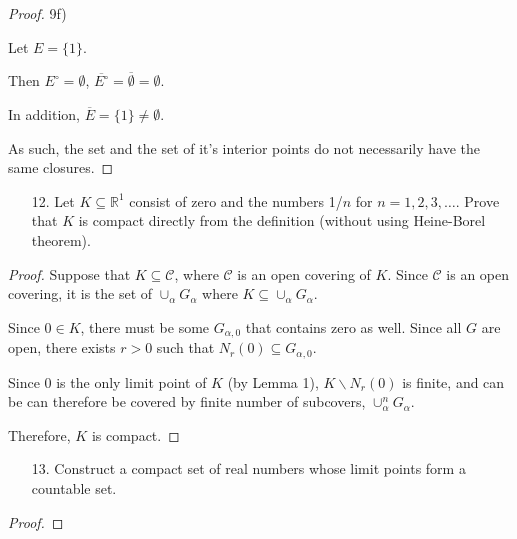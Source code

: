 \documentclass[10pt]{article}
\theoremstyle{definition}
\theoremstyle{plain}
\newcommand{\R}{\mathbb{R}}
\begin{document}
\begin{proof}
9f)

Let $E=\{1\}$.

Then $E^\circ = \emptyset$, $\overline{E^\circ} = \overline{\emptyset} = \emptyset$.

In addition, $\overline{E} = \{1\} \neq \emptyset$.

As such, the set and the set of it's interior points do not necessarily have the same closures.
\end{proof}




\pagebreak




\begin{enumerate}
\item[12.] Let $K\subseteq \R^1$ consist of zero and the numbers 1/$n$ for $n=1,2,3,\dots.$ Prove that $K$ is compact directly from the definition (without using Heine-Borel theorem).
\end{enumerate}

\begin{proof}
Suppose that $K\subseteq \mathcal{C}$, where $\mathcal{C}$ is an open covering of $K$. Since $\mathcal{C}$ is an open covering, it is the set of $\cup_\alpha G_\alpha$ where $K\subseteq \cup_\alpha G_\alpha$.

Since $0\in K$, there must be some $G_{\alpha,0}$ that contains zero as well. Since all $G$ are open, there exists $r>0$ such that $N_r (0)\subseteq G_{\alpha,0}$.

Since 0 is the only limit point of $K$ (by Lemma 1), $K\backslash N_r(0)$ is finite, and can be can therefore be covered by finite number of subcovers, $\cup_\alpha^n G_\alpha$.

Therefore, $K$ is compact.
\end{proof}




\pagebreak




\begin{enumerate}
\item[13.] Construct a compact set of real numbers whose limit points form a countable set.
\end{enumerate}

\begin{proof}

\end{proof}




\pagebreak
\end{document}
